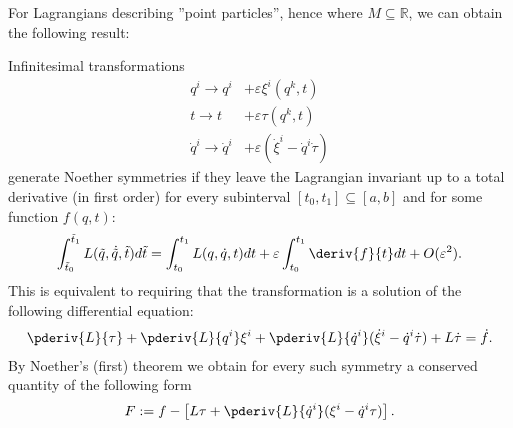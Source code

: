 
    For Lagrangians describing ''point particles'', hence where $M\subseteq\mathbb{R}$, we can obtain the following result:
    \begin{example}
        Infinitesimal transformations
        \begin{align*}
            q^i \longrightarrow q^i& + \varepsilon\xi^i(q^k,t)\\
            t \longrightarrow t& + \varepsilon\tau(q^k,t)\\
            \dot{q}^i \longrightarrow \dot{q}^i& + \varepsilon(\dot{\xi}^i - \dot{q}^i\dot{\tau})
        \end{align*}
        generate Noether symmetries if they leave the Lagrangian invariant up to a total derivative (in first order) for every subinterval $[t_0, t_1]\subseteq[a, b]$ and for some function $f(q, t)$:
        \begin{gather}
            \int_{\tilde{t}_0}^{\tilde{t}_1}L(\tilde{q}, \dot{\tilde{q}}, \tilde{t})d\tilde{t} = \int_{t_0}^{t_1}L(q,\dot{q},t)dt + \varepsilon\int_{t_0}^{t_1}\deriv{f}{t}dt + O(\varepsilon^2).
        \end{gather}
        This is equivalent to requiring that the transformation is a solution of the following differential equation:
        \begin{gather}
            \pderiv{L}{\tau} + \pderiv{L}{q^i}\xi^i + \pderiv{L}{\dot{q}^i}(\dot{\xi}^i - \dot{q}^i\dot{\tau}) + L\dot{\tau} = \dot{f}.
        \end{gather}
        By Noether's (first) theorem we obtain for every such symmetry a conserved quantity of the following form
        \begin{gather}
            F := f - \left[L\tau + \pderiv{L}{\dot{q}^i}(\xi^i - \dot{q}^i\tau)\right].
        \end{gather}
    \end{example}

